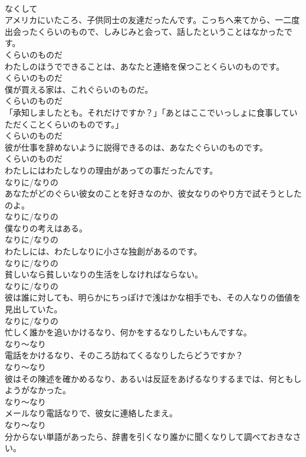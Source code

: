 \documentclass[8pt]{extreport}
\begin{document}
\begin{CJK}{UTF8}{min}
\\	なくして	
\\	アメリカにいたころ、子供同士の友達だったんです。こっちへ来てから、一二度出会ったくらいのもので、しみじみと会って、話したということはなかったです。	
\\	くらいのものだ	
\\	わたしのほうでできることは、あなたと連絡を保つことくらいのものです。	
\\	くらいのものだ	
\\	僕が買える家は、これぐらいのものだ。	
\\	くらいのものだ	
\\	「承知しましたとも。それだけですか？」「あとはここでいっしょに食事していただくことくらいのものです。」	
\\	くらいのものだ	
\\	彼が仕事を辞めないように説得できるのは、あなたぐらいのものです。	
\\	くらいのものだ	
\\	わたしにはわたしなりの理由があっての事だったんです。	
\\	なりに/なりの	
\\	あなたがどのぐらい彼女のことを好きなのか、彼女なりのやり方で試そうとしたのよ。	
\\	なりに/なりの	
\\	僕なりの考えはある。	
\\	なりに/なりの	
\\	わたしには、わたしなりに小さな独創があるのです。	
\\	なりに/なりの	
\\	貧しいなら貧しいなりの生活をしなければならない。	
\\	なりに/なりの	
\\	彼は誰に対しても、明らかにちっぽけで浅はかな相手でも、その人なりの価値を見出していた。	
\\	なりに/なりの	
\\	忙しく誰かを追いかけるなり、何かをするなりしたいもんですな。	
\\	なり～なり	
\\	電話をかけるなり、そのころ訪ねてくるなりしたらどうですか？	
\\	なり～なり	
\\	彼はその陳述を確かめるなり、あるいは反証をあげるなりするまでは、何ともしようがなかった。	
\\	なり～なり	
\\	メールなり電話なりで、彼女に連絡したまえ。	
\\	なり～なり	
\\	分からない単語があったら、辞書を引くなり誰かに聞くなりして調べておきなさい。	

\end{CJK}
\end{document}
